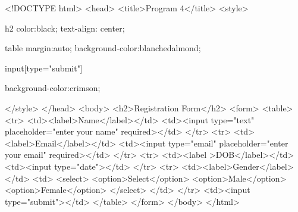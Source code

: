 <!DOCTYPE html> 
<head> 
    <title>Program 4</title> 
    <style>
    
    h2{ 
        color:black; 
        text-align: center; 
        } 
        
       

        table{ 
        margin:auto; 
        background-color:blanchedalmond;  
        }
         
        input[type="submit"]{ 
        background-color:crimson; 
        
        }
        </style> 
</head> 
<body> 
    <h2>Registration Form</h2> 
    <form> 
        <table> 
            <tr> 
                <td><label>Name</label></td> 
                <td><input type="text" placeholder="enter your name" required></td> 
            </tr> 
            <tr> 
                <td><label>Email</label></td> 
                <td><input type="email" placeholder="enter your email" required></td> 
            </tr> 
            <tr> 
                <td><label >DOB</label></td> 
                <td><input type="date"></td> 
            </tr> 
            <tr> 
                <td><label>Gender</label></td> 
                <td> 
                    <select> 
                        <option>Select</option> 
                        <option>Male</option> 
                        <option>Female</option> 
                    </select> 
                </td> 
</tr> 
<td><input type="submit"></td> 
</table> 
</form> 
</body> 
</html>
